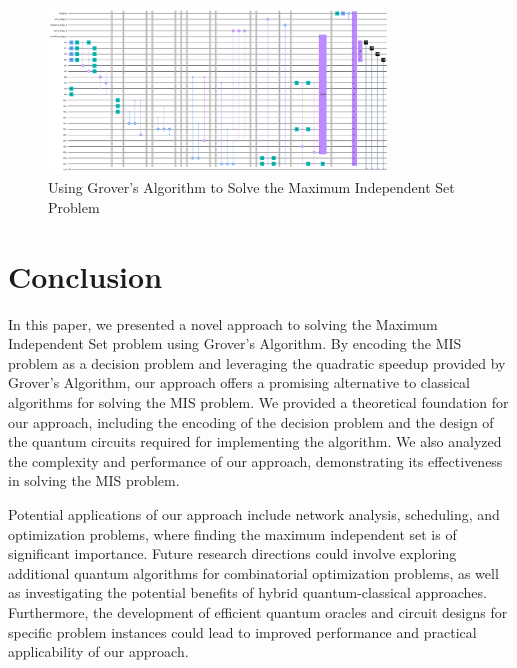 \begin{figure}[htp]
    \centering
    \includegraphics[width=9cm]{Figures/Maximum_Independent_Set_circuit.png}
    \caption{Using Grover's Algorithm to Solve the Maximum Independent Set Problem}
    \label{fig:Maximum_Independent_Set}
\end{figure}

\section{Conclusion}
\label{sec:conclusion}

In this paper, we presented a novel approach to solving the Maximum Independent Set problem using Grover's Algorithm. By encoding the MIS problem as a decision problem and leveraging the quadratic speedup provided by Grover's Algorithm, our approach offers a promising alternative to classical algorithms for solving the MIS problem. We provided a theoretical foundation for our approach, including the encoding of the decision problem and the design of the quantum circuits required for implementing the algorithm. We also analyzed the complexity and performance of our approach, demonstrating its effectiveness in solving the MIS problem.

Potential applications of our approach include network analysis, scheduling, and optimization problems, where finding the maximum independent set is of significant importance. Future research directions could involve exploring additional quantum algorithms for combinatorial optimization problems, as well as investigating the potential benefits of hybrid quantum-classical approaches. Furthermore, the development of efficient quantum oracles and circuit designs for specific problem instances could lead to improved performance and practical applicability of our approach.

